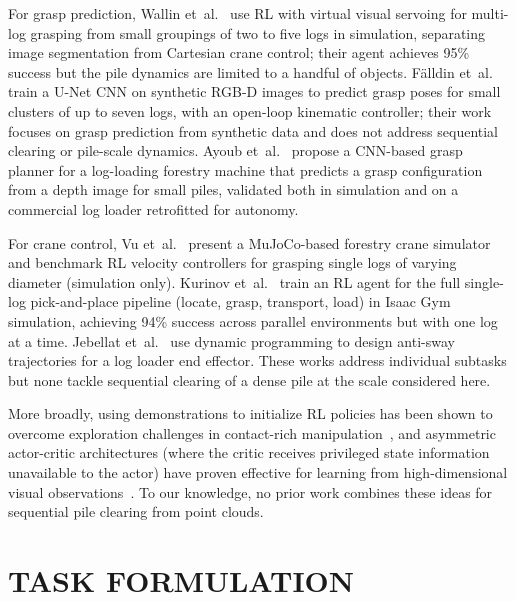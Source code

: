 \documentclass[letterpaper, 10 pt, conference]{ieeeconf}
\begin{document}
For grasp prediction, Wallin et~al.~\cite{wallin2024multilog} use RL with virtual visual servoing for multi-log grasping from small groupings of two to five logs in simulation, separating image segmentation from Cartesian crane control; their agent achieves 95\% success but the pile dynamics are limited to a handful of objects.
F{\"a}lldin et~al.~\cite{falldin2025synthesizing} train a U-Net CNN on synthetic RGB-D images to predict grasp poses for small clusters of up to seven logs, with an open-loop kinematic controller; their work focuses on grasp prediction from synthetic data and does not address sequential clearing or pile-scale dynamics.
Ayoub et~al.~\cite{ayoub2023grasp} propose a CNN-based grasp planner for a log-loading forestry machine that predicts a grasp configuration from a depth image for small piles, validated both in simulation and on a commercial log loader retrofitted for autonomy.

For crane control, Vu et~al.~\cite{vu2025autonomous} present a MuJoCo-based forestry crane simulator and benchmark RL velocity controllers for grasping single logs of varying diameter (simulation only).
Kurinov et~al.~\cite{kurinov2025reinforcement} train an RL agent for the full single-log pick-and-place pipeline (locate, grasp, transport, load) in Isaac Gym simulation, achieving 94\% success across parallel environments but with one log at a time.
Jebellat et~al.~\cite{jebellat2025designing} use dynamic programming to design anti-sway trajectories for a log loader end effector.
These works address individual subtasks but none tackle sequential clearing of a dense pile at the scale considered here.

More broadly, using demonstrations to initialize RL policies has been shown to overcome exploration challenges in contact-rich manipulation~\cite{rajeswaran2018learning, nair2018overcoming}, and asymmetric actor-critic architectures (where the critic receives privileged state information unavailable to the actor) have proven effective for learning from high-dimensional visual observations~\cite{pinto2018asymmetric}.
To our knowledge, no prior work combines these ideas for sequential pile clearing from point clouds.

\section{TASK FORMULATION}
\end{document}
